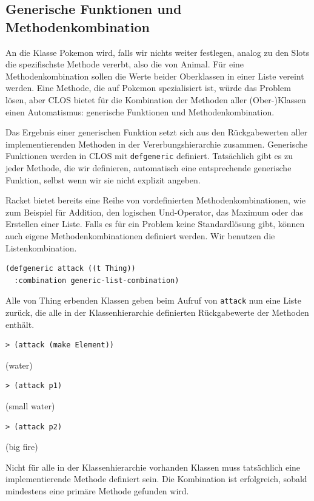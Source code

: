 \subsection{Generische Funktionen und Methodenkombination}
An die Klasse Pokemon wird, falls wir nichts weiter festlegen, analog zu den Slots die spezifischste Methode vererbt, also die von Animal. Für eine Methodenkombination sollen die Werte beider Oberklassen in einer Liste vereint werden. Eine Methode, die auf Pokemon spezialisiert ist, würde das Problem lösen, aber CLOS bietet für die Kombination der Methoden aller (Ober-)Klassen einen Automatismus: generische Funktionen und Methodenkombination. 

Das Ergebnis einer generischen Funktion setzt sich aus den Rückgabewerten aller implementierenden Methoden in der Vererbungshierarchie zusammen. Generische Funktionen werden in CLOS mit \texttt{defgeneric} definiert. Tatsächlich gibt es zu jeder Methode, die wir definieren, automatisch eine entsprechende generische Funktion, selbst wenn wir sie nicht explizit angeben. 

Racket bietet bereits eine Reihe von vordefinierten Methodenkombinationen, wie zum Beispiel für Addition, den logischen Und-Operator, das Maximum oder das Erstellen einer Liste. Falls es für ein Problem keine Standardlösung gibt, können auch eigene Methodenkombinationen definiert werden. Wir benutzen die Listenkombination.

\begin{lstlisting}
(defgeneric attack ((t Thing))
  :combination generic-list-combination)
\end{lstlisting}

Alle von Thing erbenden Klassen geben beim Aufruf von \texttt{attack} nun eine Liste zurück, die alle in der Klassenhierarchie definierten Rückgabewerte der Methoden enthält.

\begin{lstlisting}
> (attack (make Element))
\end{lstlisting}
{\rsymbol (water)}

\begin{lstlisting}
> (attack p1)
\end{lstlisting}
{\rsymbol (small water)}

\begin{lstlisting}
> (attack p2)
\end{lstlisting}
{\rsymbol (big fire)}

Nicht für alle in der Klassenhierarchie vorhanden Klassen muss tatsächlich eine implementierende Methode definiert sein. Die Kombination ist erfolgreich, sobald mindestens eine primäre Methode gefunden wird.

